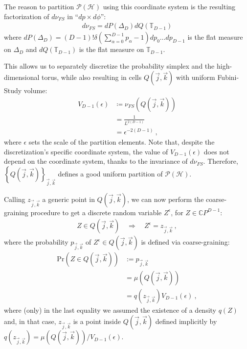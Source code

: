 \documentclass[draft,nofootinbib,pre,twocolumn,showkeys,superscriptaddress,preprintnumbers,floatfix]{revtex4-1}
\newcommand{\1}{\mathbbm{1}}
\newcommand{\PH}{\mathcal{P}(\mathcal{H})}
\newcommand{\CP}[1]{\mathbb{C}P^{#1}}
\newcommand{\QJK}[2]{Q( \vec{#1},\vec{#2})}
\begin{document}
The reason to partition $\PH$ using this coordinate system is the resulting
factorization of $d\nu_{FS}$ in ``$d p \times d \phi$'':
\begin{align*}
d\nu_{FS} = dP(\Delta_D) dQ(\mathbb{T}_{D-1})
\end{align*}
where $dP(\Delta_D) = (D-1)! \delta \left(\sum_{\alpha=0}^{D-1}p_\alpha - 1
\right) dp_0 \ldots dp_{D-1}$ is the flat measure on $\Delta_D$ and
$dQ(\mathbb{T}_{D-1})$ is the flat measure on $\mathbb{T}_{D-1}$.

This allows us to separately discretize the probability simplex and the
high-dimensional torus, while also resulting in cells $Q(\vec{j},\vec{k})$ 
with uniform Fubini-Study volume:
\begin{align}
V_{D-1}(\epsilon) & \coloneqq \nu_{FS}(Q(\vec{j},\vec{k}))
  \nonumber \\
  & = \frac{1}{L^{2(D-1)}} \nonumber \\
  & = \epsilon^{-2(D-1)}
  ~,
\label{eq:volume}
\end{align}
where $\epsilon$ sets the scale of the partition elements. Note that, despite
the discretization's specific coordinate system, the value of
$V_{D-1}(\epsilon)$ does not depend on the coordinate system, thanks to the 
invariance of $d\nu_{FS}$. Therefore, $\left\{
Q(\vec{j},\vec{k})\right\}_{\vec{j},\vec{k}}$ defines a good uniform partition
of $\PH$.

Calling $z_{\vec{j},\vec{k}}$ a generic point in $Q(\vec{j},\vec{k})$, we can
now perform the coarse-graining procedure to get a discrete random variable
$Z^\epsilon$, for $Z \in \CP{D-1}$:
\begin{align*}
Z \in Q(\vec{j},\vec{k}) \quad \Rightarrow \quad Z^\epsilon = z_{\vec{j},\vec{k}}
  ~,
\end{align*}
where the probability $p_{\vec{j},\vec{k}}$ of $Z^\epsilon \in \QJK{j}{k}$ is
defined via coarse-graining:
\begin{align}
\mathrm{Pr} \left( Z \in \QJK{j}{k}\right) &:= p_{\vec{j},\vec{k}} \nonumber \\
  & = \mu(\QJK{j}{k}) \nonumber \\ 
  & = q(z_{\vec{j},\vec{k}}) V_{D-1}(\epsilon) 
  ~,
\label{eq:coarse}
\end{align}
where (only) in the last equality we assumed the existence of a density $q(Z)$
and, in that case, $z_{\vec{j},\vec{k}}$ is a point inside $Q(\vec{j},\vec{k})$
defined implicitly by $q(z_{\vec{j},\vec{k}}) = \mu(Q(\vec{j},\vec{k})) /
V_{D-1}(\epsilon)$.
\end{document}
